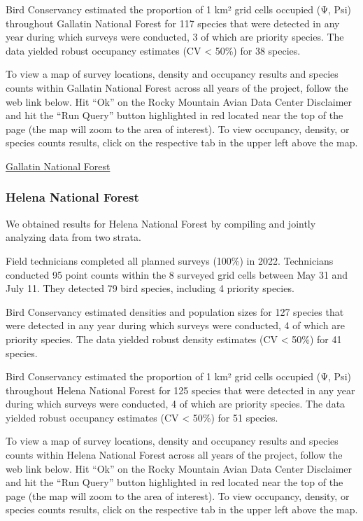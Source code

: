 \documentclass[
  letterpaper,
  DIV=11,
  numbers=noendperiod,
  oneside]{scrreprt}
\begin{document}
Bird Conservancy estimated the proportion of 1 km² grid cells occupied
(Ψ, Psi) throughout Gallatin National Forest for 117 species that were
detected in any year during which surveys were conducted, 3 of which are
priority species. The data yielded robust occupancy estimates (CV
\textless{} 50\%) for 38 species.

To view a map of survey locations, density and occupancy results and
species counts within Gallatin National Forest across all years of the
project, follow the web link below. Hit ``Ok'' on the Rocky Mountain
Avian Data Center Disclaimer and hit the ``Run Query'' button
highlighted in red located near the top of the page (the map will zoom
to the area of interest). To view occupancy, density, or species counts
results, click on the respective tab in the upper left above the map.

\href{http://www.rmbo.org/new_site/adc/QueryWindow.aspx\#N4IgzgrgDgpgTmALnAhoiBbEAuABCAcRQBti0BLAO1wDkKB7Sk3AMXrhiRAF8g==}{Gallatin
National Forest}

\hypertarget{helena-national-forest}{%
\subsubsection{Helena National Forest}\label{helena-national-forest}}

We obtained results for Helena National Forest by compiling and jointly
analyzing data from two strata.

Field technicians completed all planned surveys (100\%) in 2022.
Technicians conducted 95 point counts within the 8 surveyed grid cells
between May 31 and July 11. They detected 79 bird species, including 4
priority species.

Bird Conservancy estimated densities and population sizes for 127
species that were detected in any year during which surveys were
conducted, 4 of which are priority species. The data yielded robust
density estimates (CV \textless{} 50\%) for 41 species.

Bird Conservancy estimated the proportion of 1 km² grid cells occupied
(Ψ, Psi) throughout Helena National Forest for 125 species that were
detected in any year during which surveys were conducted, 4 of which are
priority species. The data yielded robust occupancy estimates (CV
\textless{} 50\%) for 51 species.

To view a map of survey locations, density and occupancy results and
species counts within Helena National Forest across all years of the
project, follow the web link below. Hit ``Ok'' on the Rocky Mountain
Avian Data Center Disclaimer and hit the ``Run Query'' button
highlighted in red located near the top of the page (the map will zoom
to the area of interest). To view occupancy, density, or species counts
results, click on the respective tab in the upper left above the map.
\end{document}
